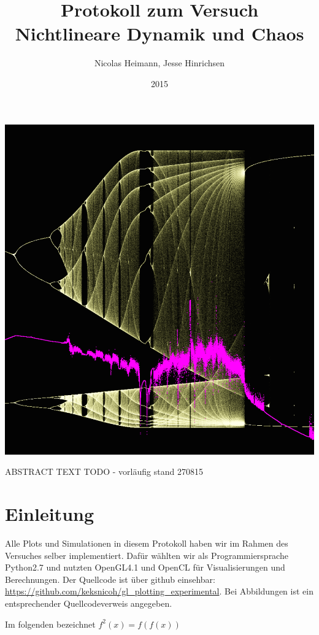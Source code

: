 \documentclass{scrartcl}
\title{Protokoll zum Versuch Nichtlineare Dynamik und Chaos}
\author{Nicolas Heimann, Jesse Hinrichsen}
\affil{\textit{Universität Hamburg}}
\date{2015}
\begin{document}
\maketitle
\begin{center}
\includegraphics[scale=0.25]{funfunfun} 
\end{center}

\begin{description}
\item ABSTRACT TEXT TODO - vorläufig stand 270815
\end{description}

\section{Einleitung}
Alle Plots und Simulationen in diesem Protokoll haben wir im Rahmen des Versuches selber implementiert. Dafür wählten wir als Programmiersprache Python2.7 und nutzten OpenGL4.1 und OpenCL für Visualisierungen und Berechnungen. Der Quellcode ist über github einsehbar: \url{https://github.com/keksnicoh/gl_plotting_experimental}. Bei Abbildungen ist ein entsprechender Quellcodeverweis angegeben. 

Im folgenden bezeichnet $f^2(x) = f(f(x))$
\end{document}
